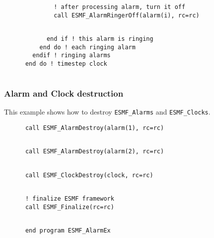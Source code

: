
 \begin{verbatim}
              ! after processing alarm, turn it off
              call ESMF_AlarmRingerOff(alarm(i), rc=rc)
 
\end{verbatim}
 

 \begin{verbatim}
            end if ! this alarm is ringing
          end do ! each ringing alarm
        endif ! ringing alarms
      end do ! timestep clock
 
\end{verbatim}
 

  \subsubsection{Alarm and Clock destruction}
 
   This example shows how to destroy {\tt ESMF\_Alarms} and {\tt ESMF\_Clocks}. 

 \begin{verbatim}
      call ESMF_AlarmDestroy(alarm(1), rc=rc)
 
\end{verbatim}
 

 \begin{verbatim}
      call ESMF_AlarmDestroy(alarm(2), rc=rc)
 
\end{verbatim}
 

 \begin{verbatim}
      call ESMF_ClockDestroy(clock, rc=rc)
 
\end{verbatim}
 

 \begin{verbatim}
      ! finalize ESMF framework
      call ESMF_Finalize(rc=rc)
 
\end{verbatim}
 

 \begin{verbatim}
      end program ESMF_AlarmEx
 
\end{verbatim}

\setlength{\parskip}{\oldparskip}
\setlength{\parindent}{\oldparindent}
\setlength{\baselineskip}{\oldbaselineskip}

